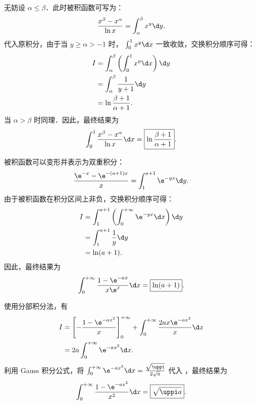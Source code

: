 \begin{solution}

    无妨设 $\alpha \leqslant \beta$．此时被积函数可写为：
    \begin{equation}
        \frac{x^\beta - x^\alpha}{\ln x} = \int_{\alpha}^{\beta} x^y \d y.
    \end{equation}
    代入原积分，由于当 $y \geqslant \alpha > -1$ 时， $\int_0^1 x^y \d x$ 一致收敛，交换积分顺序可得：
    \begin{equation}
        \begin{aligned}
            I & = \int_{\alpha}^{\beta} \left( \int_0^1 x^y \d x \right) \d y \\
              & = \int_{\alpha}^{\beta} \frac{1}{y+1} \d y                    \\
              & = \ln \frac{\beta+1}{\alpha+1}.
        \end{aligned}
    \end{equation}
    当 $\alpha > \beta$ 时同理．因此，最终结果为
    \begin{equation}
        \int_0^1 \frac{x^\beta - x^\alpha}{\ln x} \d x = \boxed{\ln \frac{\beta+1}{\alpha+1}}.
    \end{equation}


    被积函数可以变形并表示为双重积分：
    \begin{equation}
        \frac{\e^{-x} - \e^{-(a+1)x}}{x} = \int_{1}^{a+1} \e^{-yx} \d y.
    \end{equation}
    由于被积函数在积分区间上非负，交换积分顺序可得：
    \begin{equation}
        \begin{aligned}
            I & = \int_{1}^{a+1} \left( \int_0^{+\infty} \e^{-yx} \d x \right) \d y \\
              & = \int_{1}^{a+1} \frac{1}{y} \d y                                   \\
              & = \ln(a+1).
        \end{aligned}
    \end{equation}
    因此，最终结果为
    \begin{equation}
        \int_0^{+\infty} \frac{1 - \e^{-ax}}{x\e^x} \d x = \boxed{\ln(a+1)}.
    \end{equation}


    使用分部积分法，有
    \begin{equation}\label{eq:item3-calc}
        \begin{aligned}
            I & = \left[ -\frac{1 - \e^{-ax^2}}{x} \right]_0^{+\infty} + \int_0^{+\infty} \frac{2ax\e^{-ax^2}}{x} \d x \\
              & = 2a \int_0^{+\infty} \e^{-ax^2} \d x.
        \end{aligned}
    \end{equation}
    利用 Gauss 积分公式，将 $\int_0^{+\infty} \e^{-ax^2} \d x = \frac{\sqrt{\uppi}}{2\sqrt{a}}$ 代入 ，最终结果为
    \begin{equation}
        \int_0^{+\infty} \frac{1 - \e^{-ax^2}}{x^2} \d x = \boxed{\sqrt{\uppi a}}.
    \end{equation}


\end{solution}
